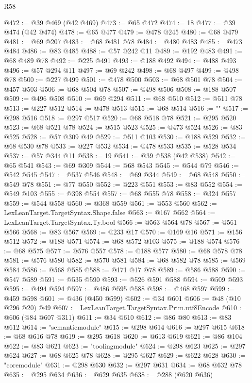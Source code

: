 \begin{lexlean}{R58}
\begin{coremodule}
{@472 := @39 @469 (@42 @469)
@473 := @65 @472
@474 := 18
@477 := @39 @474 (@42 @474)
@478 := @65 @477
@479 := @478 @245
@480 := @68 @479
@481 := @69 @207
@483 := @68 @481 @78
@484 := @480 @483
@485 := @473 @484
@486 := @83 @485
@488 := @57 @242 @11
@489 := @192 @483
@491 := @68 @489 @78
@492 := @225 @491
@493 := @188 @492
@494 := @488 @493
@496 := @57 @294 @11
@497 := @69 @242
@498 := @68 @497
@499 := @498 @78
@500 := @227 @499
@501 := @478 @500
@503 := @68 @501 @78
@504 := @457 @503
@506 := @68 @504 @78
@507 := @498 @506
@508 := @188 @507
@509 := @496 @508
@510 := @69 @294
@511 := @68 @510
@512 := @511 @78
@513 := @227 @512
@514 := @478 @513
@515 := @68 @514
@516 := "{"
@517 := @298 @516
@518 := @297 @517
@520 := @68 @518 @78
@521 := @295 @520
@523 := @68 @521 @78
@524 := @515 @523
@525 := @473 @524
@526 := @83 @525
@528 := @57 @309 @49
@529 := @511 @103
@530 := @188 @529
@532 := @68 @530 @78
@533 := @227 @532
@534 := @478 @533
@535 := @528 @534
@537 := @57 @344 @11
@538 := 19
@541 := @39 @538 (@42 @538)
@542 := @65 @541
@543 := @69 @309
@544 := @68 @543
@545 := @544 @79
@546 := @542 @545
@547 := @537 @546
@548 := @69 @344
@549 := @68 @548
@550 := @549 @78
@551 := @77 @550
@552 := @223 @551
@553 := @83 @552
@554 := @549 @103
@555 := @398 @554
@557 := @68 @555 @78
@558 := @324 @557
@559 := @544 @558
@560 := @368 @559
@561 := @553 @560
@562 := LexLeanTarget.TargetSyntax.Shape.false
@563 := @167 @562
@564 := LexLeanTarget.TargetSyntax.Ty.bool
@566 := @563 @564 @78
@567 := @561 @566
@568 := @83 @567
@569 := @233 @17
@570 := @169 @16
@571 := @156 @512
@572 := @188 @571
@574 := @68 @572 @103
@575 := @188 @574
@576 := @68 @575
@577 := @576 @557
@578 := @188 @577
@580 := @68 @578 @78
@581 := @576 @580
@582 := @570 @581
@584 := @68 @582 @78
@585 := @569 @584
@586 := @568 @585
@588 := @171 @17 @78
@589 := @586 @588
@590 := @547 @589
@591 := @535 @590
@593 := @526 @591 @588
@594 := @509 @593
@595 := @494 @594
@597 := @486 @595 @588
@598 := @468 @597
@599 := @459 @598
@601 := @436 (@450 @599)
@602 := @34 @601
@606 := @48 (@10 @296 @20) @49
@607 := LexLeanTarget.TargetSyntax.Prim.utf8Encode
@610 := @606 (@84 @607 @311)
@611 := @34 @610
@612 := @86 @80
@613 := @83 @612
@614 := "semanticmodule"
@615 := @298 @614
@616 := @297 @615
@618 := @68 @616 @78
@619 := @295 @618
@620 := @613 @619
@621 := @86 @104
@622 := @83 @621
@623 := "toolingmodule"
@624 := @298 @623
@625 := @297 @624
@627 := @68 @625 @78
@628 := @295 @627
@629 := @622 @628
@630 := "coremodule"
@631 := @298 @630
@632 := @297 @631
@634 := @68 @632 @78
@635 := @295 @634
@636 := @629 @635
@638 := @288 (@620 @636)
}}
\end{coremodule}
\end{lexlean}
